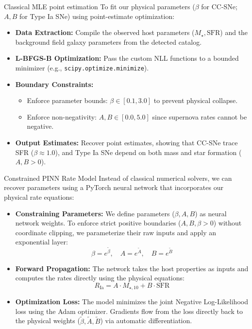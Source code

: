 \documentclass[9pt]{beamer}
\begin{document}
\begin{frame}{Classical MLE point estimation}
  To fit our physical parameters ($\beta$ for CC-SNe; $A, B$ for Type Ia SNe) using point-estimate optimization:
  \begin{itemize}
    \item \textbf{Data Extraction:} Compile the observed host parameters ($M_\star, \text{SFR}$) and the background field galaxy parameters from the detected catalog.
    \item \textbf{L-BFGS-B Optimization:} Pass the custom NLL functions to a bounded minimizer (e.g., \texttt{scipy.optimize.minimize}).
    \item \textbf{Boundary Constraints:}
      \begin{itemize}
        \item Enforce parameter bounds: $\beta \in [0.1, 3.0]$ to prevent physical collapse.
        \item Enforce non-negativity: $A, B \in [0.0, 5.0]$ since supernova rates cannot be negative.
      \end{itemize}
    \item \textbf{Output Estimates:} Recover point estimates, showing that CC-SNe trace SFR ($\beta \approx 1.0$), and Type Ia SNe depend on both mass and star formation ($A, B > 0$).
  \end{itemize}
\end{frame}

\begin{frame}{Constrained PINN Rate Model}
  Instead of classical numerical solvers, we can recover parameters using a PyTorch neural network that incorporates our physical rate equations:
  \begin{itemize}
    \item \textbf{Constraining Parameters:} We define parameters ($\beta, A, B$) as neural network weights. To enforce strict positive boundaries ($A, B, \beta > 0$) without coordinate clipping, we parameterize their raw inputs and apply an exponential layer:
      $$\beta = e^{\tilde{\beta}}, \quad A = e^{\tilde{A}}, \quad B = e^{\tilde{B}}$$
    \item \textbf{Forward Propagation:} The network takes the host properties as inputs and computes the rates directly using the physical equations:
      $$R_{\text{Ia}} = A \cdot M_{\star, 10} + B \cdot \text{SFR}$$
    \item \textbf{Optimization Loss:} The model minimizes the joint Negative Log-Likelihood loss using the Adam optimizer. Gradients flow from the loss directly back to the physical weights ($\tilde{\beta}, \tilde{A}, \tilde{B}$) via automatic differentiation.
  \end{itemize}
\end{frame}
\end{document}
